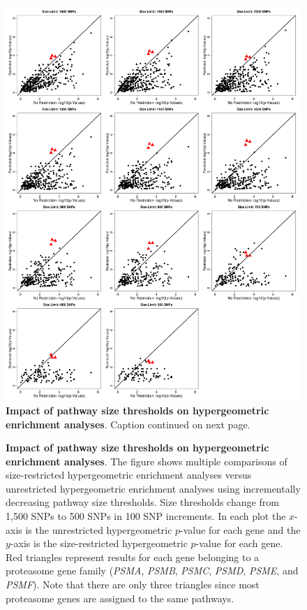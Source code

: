 \setlength{\footskip}{2cm}
\begin{figure}[htbp]
\centering
\vspace*{-1.75cm}
\hspace*{-1cm}
\includegraphics[scale=.325]{Images/Supp/InterPath_Supp_Figure_Hypergemeotric_SizeThresholds_vs1.png}
\caption[TBD]{\textbf{Impact of pathway size thresholds on hypergeometric enrichment analyses}. Caption continued on next page.}
\label{InterPath-Supp-Figure-Hypergeoemtric-SizeThresholds}
\end{figure}
\clearpage
\setlength{\footskip}{1cm}

\addtocounter{figure}{-1}
\begin{figure} [t!]
  \caption{\textbf{Impact of pathway size thresholds on hypergeometric enrichment analyses}. The figure shows multiple comparisons of size-restricted hypergeometric enrichment analyses versus unrestricted hypergeometric enrichment analyses using incrementally decreasing pathway size thresholds. Size thresholds change from 1,500 SNPs to 500 SNPs in 100 SNP increments. In each plot the $x$-axis is the unrestricted hypergeometric $p$-value for each gene and the $y$-axis is the size-restricted hypergeometric $p$-value for each gene. Red triangles represent results for each gene belonging to a proteasome gene family ({\emph{PSMA}}, {\emph{PSMB}}, {\emph{PSMC}}, {\emph{PSMD}}, {\emph{PSME}}, and {\emph{PSMF}}). Note that there are only three triangles since most proteasome genes are assigned to the same pathways.}
\label{InterPath-Supp-Figure-Hypergeoemtric-SizeThresholds-Caption}
\end{figure}
\clearpage

